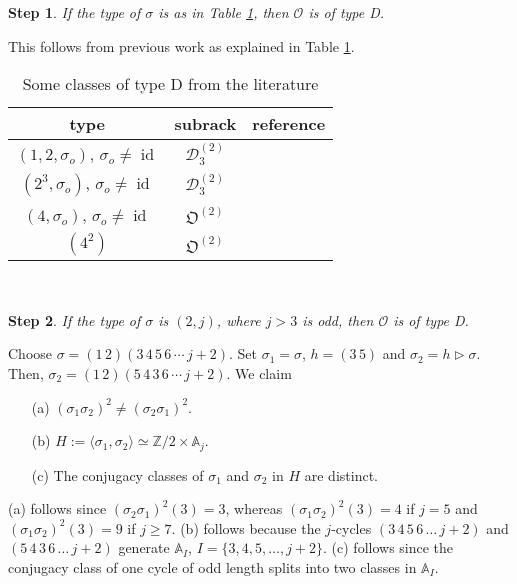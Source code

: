 \documentclass[11pt]{amsart} \textheight 22cm
\newcommand{\oct}{\mathfrak O}
\newcommand\sigmao{\sigma_{o}}
\newcommand\so{\sigmao}
\renewcommand{\^}[1]{\mbox{$^{\left( #1 \right)}$}}
\renewcommand{\_}[1]{\mbox{$_{\left( #1 \right)}$}}
\newcommand{\trid}{\triangleright}
\newcommand{\Z}{{\mathbb Z}}
\newcommand{\D}{{\mathcal D}}
\newcommand{\oc}{{\mathcal O}}
\theoremstyle{plain}
\newtheorem{step}{Step}
\theoremstyle{definition}
\theoremstyle{remark}
\newcommand\id{\operatorname{id}}
\newcommand\A{\mathbb A}
\theoremstyle{remark}
\begin{document}
\begin{step}\label{step:previo} If the type of $\sigma$ is as in Table
\ref{tab:classes-d-alt-lit}, then $\oc$ is of type D.
\end{step}

This follows from previous work as explained in Table
\ref{tab:classes-d-alt-lit}.
\begin{table}

    \begin{tabular}[hc]{|c|c|c|}
        \hline type & subrack & reference \\ \hline
        $(1, 2, \so)$, $\so\neq \id$ & $\D_3^{(2)}$ & \cite[Ex. 3.9]{AF3} \\
        $(2^3,\so)$, $\so\neq \id$ & $\D_3^{(2)}$ & \cite[Ex. 3.12]{AF3} \\
        $(4, \so)$, $\so\neq \id$ & $\oct^{(2)}$ &  \cite[Prop. 3.7]{afz} \\
        $(4^2)$ & $\oct^{(2)}$ &  \cite[Proof of Prop. 3.5]{afz}\\
        \hline
    \end{tabular}

\

    \caption{Some classes of type D from the literature}
    \label{tab:classes-d-alt-lit}
\end{table}



\begin{step}\label{step:2-j>3} If the type of $\sigma$ is $(2,j)$, where $j>3$ is odd,
then $\oc$ is of type D. \end{step}



Choose $\sigma = (1\, 2)(3\, 4\, 5\, 6\, \cdots\,j+2)$. Set
$\sigma_1=\sigma$, $h=(3\, 5)$ and $\sigma_2= h\trid \sigma$.
Then, $\sigma_2=(1\, 2)(5\, 4\, 3 \, 6 \,\cdots\,j+2)$. We claim
\begin{itemize}
    \item[(a)] $(\sigma_1 \sigma_2)^2 \neq (\sigma_2 \sigma_1)^2$.
    \item[(b)]  $H := \langle\sigma_1,\sigma_2\rangle\simeq\Z/2 \times \A_j$.
    \item[(c)] The conjugacy classes of $\sigma_1$ and $\sigma_2$ in $H$ are
distinct.
\end{itemize}


(a) follows since $(\sigma_2 \sigma_1)^2(3)=3$, whereas $(\sigma_1
\sigma_2)^2(3)=4$ if $j=5$ and $(\sigma_1 \sigma_2)^2(3)=9$ if
$j\geq 7$. (b) follows because the $j$-cycles $(3\, 4\, 5\, 6\,
\dots\,j+2)$ and $(5\, 4\, 3\, 6\, \dots\,j+2)$ generate $\A_I$,
$I=\{3,4,5,\dots,j+2\}$. (c) follows since the conjugacy class of
one cycle of odd length splits into two classes in $\A_I$.
\end{document}
